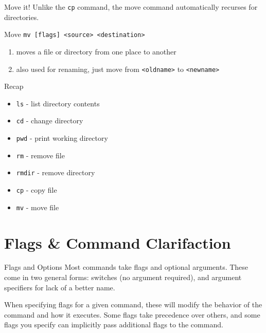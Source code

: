 \documentclass[11pt]{beamer}
\newcommand{\colbf}[1]{\textcolor{mLightBrown!77!black}{#1}}%
\begin{document}
\begin{frame}[fragile]{Move it!}
  Unlike the \texttt{cp} command, the move command automatically recurses for directories.

  \begin{block}{\colbf{M}o\colbf{v}e}
    \texttt{mv [flags] <source> <destination>}
    \begin{enumerate}[\--]
      \item moves a file or directory from one place to another
      \item also used for renaming, just move from \texttt{<oldname>} to \texttt{<newname>}
    \end{enumerate}
    \vspace*{1em}
  \end{block}
\end{frame}

\begin{frame}[fragile]{Recap}
  \begin{itemize}
    \item \texttt{ls} \-- list directory contents
    \item \texttt{cd} \-- change directory
    \item \texttt{pwd} \-- print working directory
    \item \texttt{rm} \-- remove file
    \item \texttt{rmdir} \-- remove directory
    \item \texttt{cp} \-- copy file
    \item \texttt{mv} \-- move file
  \end{itemize}
\end{frame}

%

%
\section{Flags \& Command Clarifaction}
\label{sec:flags_&_command_clarifaction}

\begin{frame}[fragile]{Flags and Options}
  Most commands take flags and optional arguments.  These come in two general forms: switches (no argument
  required), and argument specifiers for lack of a better name.

  When specifying flags for a given command, these will modify the behavior of the command and how it
  executes.  Some flags take precedence over others, and some flags you specify can implicitly pass
  additional flags to the command.
\end{frame}
\end{document}
